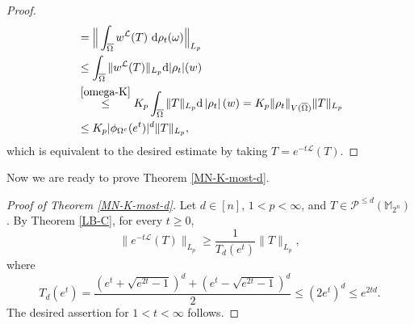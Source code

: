 \documentclass{amsbook}
\theoremstyle{definition}
\theoremstyle{remark}
\numberwithin{section}{chapter}
\numberwithin{equation}{chapter}
\newcommand{\1}{\mathbf{1}}
\begin{document}
\begin{proof}
\begin{align*}
&=\Big\|\int_{\overline{\Omega}}w^{\mathcal{L}} (T) \mathrm{~d} \rho_{t}(\omega)\Big\|_{L_{p}} \\
&\leq \int_{\overline{\Omega}}\|w^{\mathcal{L}} (T)\|_{L_{p}} \mathrm{d}|\rho_{t}|(w) \\
& \stackrel{\eqref{omega-K}}{\leq} K_p \int_{\overline{\Omega}}\|T\|_{L_{p}} \mathrm{d}\left|\rho_{t}\right|(w)=K_p\|\rho_{t}\|_{V(\overline{\Omega})}\|T\|_{L_{p}} \\
& \leq K_p |\phi_{\Omega^{c }}(e^{t})|^{d}\|T\|_{L_{p}},
\end{align*}
which is equivalent to the desired estimate by taking $T=e^{-t\mathcal{L}}(T)$.
\end{proof}


Now we are ready to prove Theorem \ref{MN-K-most-d}.
\begin{proof}[Proof of Theorem \ref{MN-K-most-d}] Let $d \in[n]$, $1<p<\infty$,   and $T\in \mathcal{P}^{\leq d}(\mathbb{M}_{2^n})$. By Theorem \ref{LB-C}, for every $t \geq 0$,
$$
\|e^{-t \mathcal{L}} (T)\|_{L_{p}} \geq \frac{1}{T_{d}(e^{t})}\|T\|_{L_{p}},
$$
where
$$T_{d}(e^t)=\frac{(e^t+\sqrt{e^{2t}-1})^{d}+(e^t-\sqrt{e^{2t}-1})^{d}}{2}\leq (2e^t)^d\leq e^{2td}.$$
The desired assertion for $1<t<\infty$ follows. 


\end{proof}
\end{document}
